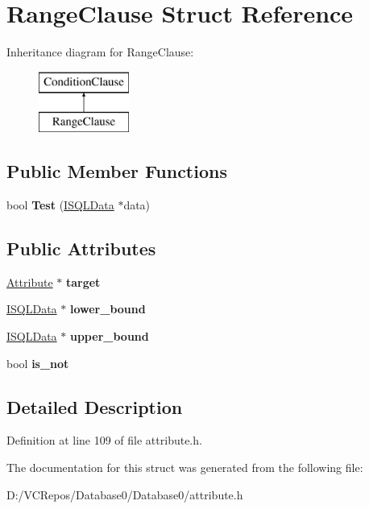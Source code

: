 \hypertarget{struct_range_clause}{}\section{Range\+Clause Struct Reference}
\label{struct_range_clause}
Inheritance diagram for Range\+Clause\+:\begin{figure}[H]
\begin{center}
\leavevmode
\includegraphics[height=2.000000cm]{struct_range_clause}
\end{center}
\end{figure}
\subsection*{Public Member Functions}
\begin{DoxyCompactItemize}
\item 
\mbox{\label{struct_range_clause_a5c4cd02be4e00c1ac8d131c2ff5dfe2f}} 
bool {\bfseries Test} (\mbox{\hyperlink{class_i_s_q_l_data}{I\+S\+Q\+L\+Data}} $\ast$data)
\end{DoxyCompactItemize}
\subsection*{Public Attributes}
\begin{DoxyCompactItemize}
\item 
\mbox{\label{struct_range_clause_a159d3962e20490ce09d468c8e8b3be1a}} 
\mbox{\hyperlink{struct_attribute}{Attribute}} $\ast$ {\bfseries target}
\item 
\mbox{\label{struct_range_clause_a7993f10ca19a94f4a3674cbf1d40222d}} 
\mbox{\hyperlink{class_i_s_q_l_data}{I\+S\+Q\+L\+Data}} $\ast$ {\bfseries lower\+\_\+bound}
\item 
\mbox{\label{struct_range_clause_aefd9bd369cec169402ac94916fbafc84}} 
\mbox{\hyperlink{class_i_s_q_l_data}{I\+S\+Q\+L\+Data}} $\ast$ {\bfseries upper\+\_\+bound}
\item 
\mbox{\label{struct_range_clause_a6af10ad1942893b8d19c97418e4d65a6}} 
bool {\bfseries is\+\_\+not}
\end{DoxyCompactItemize}


\subsection{Detailed Description}


Definition at line 109 of file attribute.\+h.



The documentation for this struct was generated from the following file\+:\begin{DoxyCompactItemize}
\item 
D\+:/\+V\+C\+Repos/\+Database0/\+Database0/attribute.\+h\end{DoxyCompactItemize}
